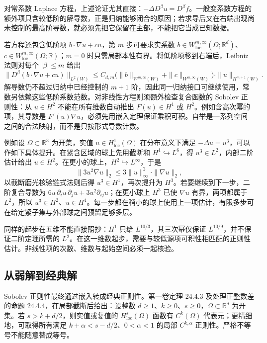对常系数 Laplace 方程，上述论证尤其直接：\(-\Delta D^\beta u=D^\beta f\)。一般变系数方程的额外项只含较低阶的解导数，正是归纳能够闭合的原因；若求导后又在右端出现尚未控制的最高阶导数，就必须先把它保留在主部，不能把它当成已知数据。

\ProseParagraphBreak

若方程还包含低阶项 \(b\cdot\nabla u+cu\)，第 \(m\) 步可要求实系数
\(b\in W_{\mathrm{loc}}^{m,\infty}(\Omega;\mathbb R^d)\)、
\(c\in W_{\mathrm{loc}}^{m,\infty}(\Omega;\mathbb R)\)；\(m=0\) 时只需局部本性有界。将低阶项移到右端后，Leibniz 法则对每个 \(|\beta|\leq m\) 给出
\[
 \|D^\beta(b\cdot\nabla u+cu)\|_{L^2(W)}
 \leq C_{d,m}
 \bigl(\|b\|_{W^{m,\infty}(W)}+\|c\|_{W^{m,\infty}(W)}\bigr)
                    \cdot\|u\|_{H^{m+1}(W)}.
\]
解导数仍不超过归纳中已经控制的 \(m+1\) 阶，因此同一归纳接口可继续使用，常数另依赖这些低阶系数范数。对非线性方程则须额外检查复合函数的 Sobolev 正则性：从 \(u\in H^2\) 不能在所有维数自动推出 \(F(u)\in H^1\) 或 \(H^2\)。例如含高次幂的项，其导数是 \(F'(u)\nabla u\)，必须先用嵌入定理保证乘积可积。自举是一系列空间之间的合法映射，而不是只按形式导数计数。

例如设 \(\Omega\subset\mathbb R^3\) 为开集，实值 \(u\in H^1_{\mathrm{loc}}(\Omega)\) 在分布意义下满足 \(-\Delta u=u^3\)，可以作如下具体提升。在紧含区域的球上先用截断和 \(H^1\hookrightarrow L^6\)，得 \(u^3\in L^2\)，内部二阶估计给出 \(u\in H^2\)。在更小的球上，\(H^2\hookrightarrow L^\infty\)，于是
\[\|3u^2\nabla u\|_2\le3\|u\|_\infty^2\cdot\|\nabla u\|_2,\]
以截断磨光核验链式法则后得 \(u^3\in H^1\)，再次提升为 \(H^3\)。若要继续到下一步，二阶复合导数为 \(6u\,\partial_i u\,\partial_j u+3u^2\partial_{ij}u\)；在更小球上 \(H^3\) 已使 \(\nabla u\) 有界，两项都属于 \(L^2\)，所以 \(u^3\in H^2\)、\(u\in H^4\)。每一步都在稍小的球上使用上一项估计，有限多步可在给定紧子集与外部球之间预留足够多层。

同样的起步在五维不能直接照抄：\(H^1\) 只给 \(L^{10/3}\)，其三次幂仅保证 \(L^{10/9}\)，并不保证二阶定理所需的 \(L^2\)。在这一维数起步，需要与较低源项可积性相匹配的正则性估计。非线性项的次数、维数与起始空间必须一起核验。

\subsection{从弱解到经典解}
\label{b2:subsec:160203}

Sobolev 正则性最终通过嵌入转成经典正则性。第一卷定理 24.4.3 及处理正整数差的命题 24.4.4，在局部截断后给出：设整数 \(d\geq1\)、\(k\geq0\)、\(s\geq0\)，\(\Omega\subset\mathbb R^d\) 为开集。若 \(s>k+d/2\)，则实值或复值的 \(H_{\mathrm{loc}}^s(\Omega)\) 函数有 \(C^k(\Omega)\) 代表元；更精细地，可取得所有满足 \(k+\alpha<s-d/2\)、\(0<\alpha<1\) 的局部 \(C^{k,\alpha}\) 正则性。严格不等号不能随意替成等号。

